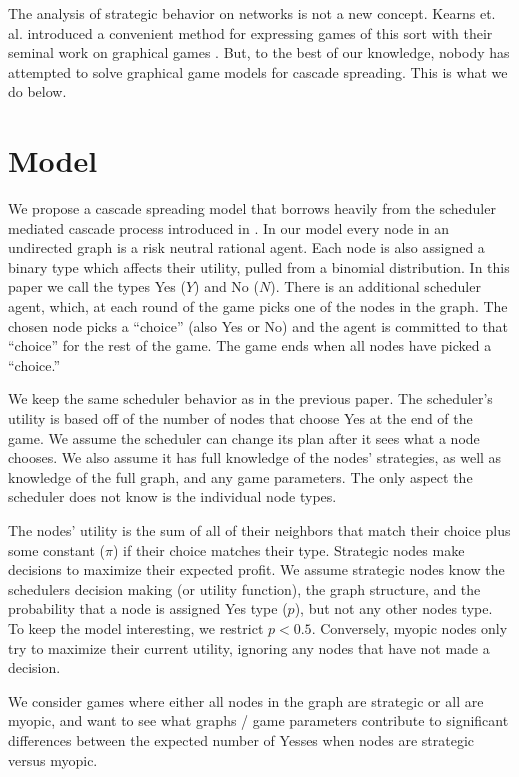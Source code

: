 \documentclass{article}
\begin{document}
The analysis of strategic behavior on networks is not a new
concept. Kearns et. al.  introduced a convenient method for expressing
games of this sort with their seminal work on graphical games
\cite{Kearns01}. But, to the best of our knowledge, nobody has
attempted to solve graphical game models for cascade
spreading.  This is what we do below.


\section{Model}
\label{prob_statement}

We propose a cascade spreading model that borrows heavily from the
scheduler mediated cascade process introduced in
\cite{Chierichetti12}. In our model every node in an undirected graph
is a risk neutral rational agent. Each node is also assigned a binary
type which affects their utility, pulled from a binomial
distribution. In this paper we call the types Yes ($Y$) and No
($N$). There is an additional scheduler agent, which, at each round of
the game picks one of the nodes in the graph. The chosen node picks a
``choice'' (also Yes or No) and the agent is committed to that
``choice'' for the rest of the game. The game ends when all nodes have
picked a ``choice.''

We keep the same scheduler behavior as in the previous paper. The
scheduler's utility is based off of the number of nodes that choose Yes
at the end of the game. We assume the scheduler can change its plan
after it sees what a node chooses. We also assume it has full
knowledge of the nodes' strategies, as well as knowledge of the full
graph, and any game parameters. The only aspect the scheduler does not
know is the individual node types.

The nodes' utility is the sum of all of their neighbors that match
their choice plus some constant ($\pi$) if their choice matches their
type. Strategic nodes make decisions to maximize their expected
profit. We assume strategic nodes know the schedulers decision making
(or utility function), the graph structure, and the probability that a
node is assigned Yes type ($p$), but not any other nodes type. To keep
the model interesting, we restrict $p < 0.5$. Conversely, myopic nodes
only try to maximize their current utility, ignoring any nodes that
have not made a decision.

We consider games where either all nodes in the graph are strategic or
all are myopic, and want to see what graphs / game parameters contribute to
significant differences between the expected number of Yesses when
nodes are strategic versus myopic.
\end{document}
